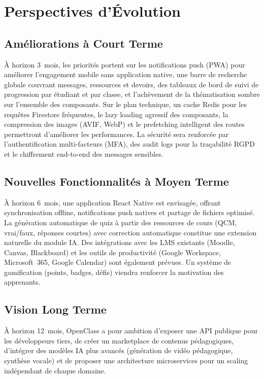 \documentclass[12pt, a4paper, twoside]{report}
\begin{document}
\chapter{Perspectives d'Évolution}

\section{Améliorations à Court Terme}

À horizon 3~mois, les priorités portent sur les notifications push (PWA) pour
améliorer l'engagement mobile sans application native, une barre de recherche
globale couvrant messages, ressources et devoirs, des tableaux de bord de suivi
de progression par étudiant et par classe, et l'achèvement de la thématisation
sombre sur l'ensemble des composants. Sur le plan technique, un cache Redis pour
les requêtes Firestore fréquentes, le lazy loading agressif des composants, la
compression des images (AVIF, WebP) et le prefetching intelligent des routes
permettront d'améliorer les performances. La sécurité sera renforcée par
l'authentification multi-facteurs (MFA), des audit logs pour la traçabilité RGPD
et le chiffrement end-to-end des messages sensibles.

\section{Nouvelles Fonctionnalités à Moyen Terme}

À horizon 6~mois, une application React Native est envisagée, offrant
synchronisation offline, notifications push natives et partage de fichiers
optimisé. La génération automatique de quiz à partir des ressources de cours
(QCM, vrai/faux, réponses courtes) avec correction automatique constitue une
extension naturelle du module IA. Des intégrations avec les LMS existants (Moodle,
Canvas, Blackboard) et les outils de productivité (Google Workspace,
Microsoft~365, Google Calendar) sont également prévues. Un système de gamification
(points, badges, défis) viendra renforcer la motivation des apprenants.

\section{Vision Long Terme}

À horizon 12~mois, OpenClass a pour ambition d'exposer une API publique pour les
développeurs tiers, de créer un marketplace de contenus pédagogiques, d'intégrer
des modèles IA plus avancés (génération de vidéo pédagogique, synthèse vocale) et
de proposer une architecture microservices pour un scaling indépendant de chaque
domaine.
\end{document}
